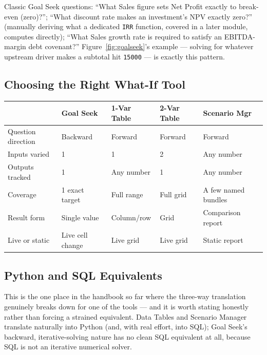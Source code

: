 \documentclass[11pt,a4paper]{article}
\begin{document}
\begin{financeapp}
Classic Goal Seek questions: ``What Sales figure sets Net Profit exactly to break-even (zero)?''; ``What discount rate makes an investment's NPV exactly zero?'' (manually deriving what a dedicated \texttt{IRR} function, covered in a later module, computes directly); ``What Sales growth rate is required to satisfy an EBITDA-margin debt covenant?'' Figure~\ref{fig:goalseek}'s example --- solving for whatever upstream driver makes a subtotal hit \texttt{15000} --- is exactly this pattern.
\end{financeapp}

\subsection{Choosing the Right What-If Tool}

\begin{center}
\begin{tabular}{@{}L{2.5cm}L{2.9cm}L{2.3cm}L{2.2cm}L{2.6cm}@{}}
\toprule
\textbf{} & \textbf{Goal Seek} & \textbf{1-Var Table} & \textbf{2-Var Table} & \textbf{Scenario Mgr} \\
\midrule
Question direction & Backward & Forward & Forward & Forward \\
Inputs varied & 1 & 1 & 2 & Any number \\
Outputs tracked & 1 & Any number & 1 & Any number \\
Coverage & 1 exact target & Full range & Full grid & A few named bundles \\
Result form & Single value & Column/row & Grid & Comparison report \\
Live or static & Live cell change & Live grid & Live grid & Static report \\
\bottomrule
\end{tabular}
\end{center}

\subsection{Python and SQL Equivalents}

\begin{keyconcept}
This is the one place in the handbook so far where the three-way translation genuinely breaks down for one of the tools --- and it is worth stating honestly rather than forcing a strained equivalent. Data Tables and Scenario Manager translate naturally into Python (and, with real effort, into SQL); Goal Seek's backward, iterative-solving nature has no clean SQL equivalent at all, because SQL is not an iterative numerical solver.
\end{keyconcept}
\end{document}
